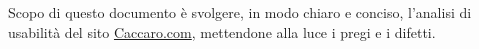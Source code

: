Scopo di questo documento è svolgere, in modo chiaro e conciso, l'analisi di usabilità del sito \url{Caccaro.com}, mettendone alla luce i pregi e i difetti.